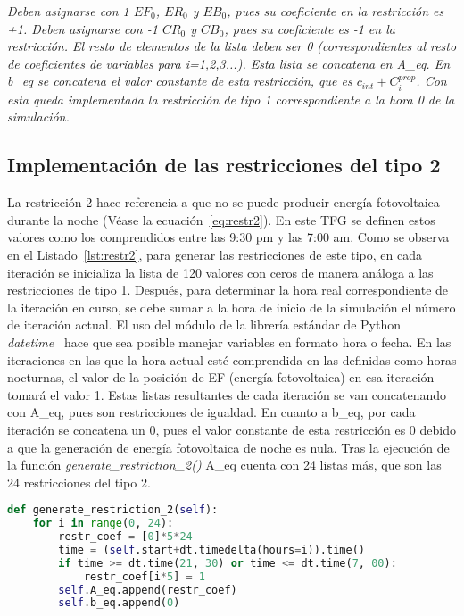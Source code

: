 \textit{Deben asignarse con 1 $ EF_{0} $, $ ER_{0} $ y $ EB_{0} $, pues su coeficiente en la restricción es +1. Deben asignarse con -1 $ CR_{0} $ y $ CB_{0} $, pues su coeficiente es -1 en la restricción. El resto de elementos de la lista deben ser 0 (correspondientes al resto de coeficientes de variables para i=1,2,3...). Esta lista se concatena en A\_eq. En b\_eq se concatena el valor constante de esta restricción, que es $ c_{int} + C_{i}^{prop} $. Con esta queda implementada la restricción de tipo 1 correspondiente a la hora 0 de la simulación.}

\subsection{Implementación de las restricciones del tipo 2}
La restricción 2 hace referencia a que no se puede producir energía fotovoltaica durante la noche (Véase la ecuación~\ref{eq:restr2}). En este \gls{TFG} se definen estos valores como los comprendidos entre las 9:30 pm y las 7:00 am. Como se observa en el Listado~\ref{lst:restr2}, para generar las restricciones de este tipo, en cada iteración se inicializa la lista de 120 valores con ceros de manera análoga a las restricciones de tipo 1. Después, para determinar la hora real correspondiente de la iteración en curso, se debe sumar a la hora de inicio de la simulación el número de iteración actual. El uso del módulo de la librería estándar de Python \textit{datetime}~\cite{Dtpy} hace que sea posible manejar variables en formato hora o fecha. En las iteraciones en las que la hora actual esté comprendida en las definidas como horas nocturnas, el valor de la posición de EF (energía fotovoltaica) en esa iteración tomará el valor 1. Estas listas resultantes de cada iteración se van concatenando con A\_eq, pues son restricciones de igualdad. En cuanto a b\_eq, por cada iteración se concatena un 0, pues el valor constante de esta restricción es 0 debido a que la generación de energía fotovoltaica de noche es nula. Tras la ejecución de la función \textit{generate\_restriction\_2()} A\_eq cuenta con 24 listas más, que son las 24 restricciones del tipo 2.
\begin{lstlisting}[language=Python,float=ht,caption={Restricciones del tipo 2},label={lst:restr2}]
def generate_restriction_2(self):
    for i in range(0, 24):
        restr_coef = [0]*5*24
        time = (self.start+dt.timedelta(hours=i)).time()
        if time >= dt.time(21, 30) or time <= dt.time(7, 00):
            restr_coef[i*5] = 1
        self.A_eq.append(restr_coef)
        self.b_eq.append(0)
\end{lstlisting}
